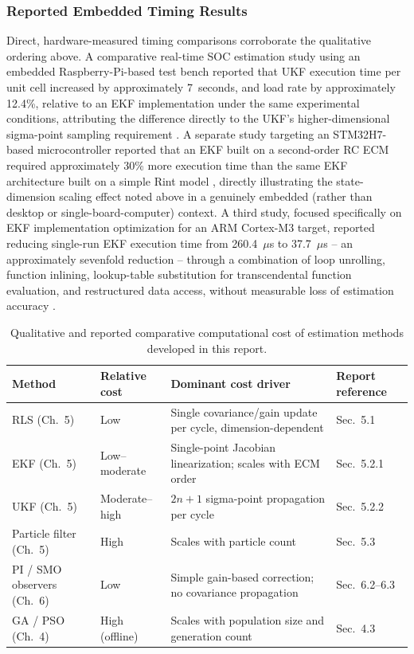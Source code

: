 \subsubsection{Reported Embedded Timing Results}
\label{ssec:reported_embedded_timing}

Direct, hardware-measured timing comparisons corroborate the qualitative ordering above. A comparative real-time SOC estimation study using an embedded Raspberry-Pi-based test bench reported that UKF execution time per unit cell increased by approximately 7~seconds, and load rate by approximately 12.4\%, relative to an EKF implementation under the same experimental conditions, attributing the difference directly to the UKF's higher-dimensional sigma-point sampling requirement \cite{realtime_soc_embedded_electronics_2022}. A separate study targeting an STM32H7-based microcontroller reported that an EKF built on a second-order RC ECM required approximately 30\% more execution time than the same EKF architecture built on a simple Rint model \cite{energy_efficient_soc_embedded_2024}, directly illustrating the state-dimension scaling effect noted above in a genuinely embedded (rather than desktop or single-board-computer) context. A third study, focused specifically on EKF implementation optimization for an ARM Cortex-M3 target, reported reducing single-run EKF execution time from 260.4~$\mu$s to 37.7~$\mu$s -- an approximately sevenfold reduction -- through a combination of loop unrolling, function inlining, lookup-table substitution for transcendental function evaluation, and restructured data access, without measurable loss of estimation accuracy \cite{ekf_embedded_optimization_researchgate}.

\begin{table}[htbp]
	\centering
	\caption{Qualitative and reported comparative computational cost of estimation methods developed in this report.}
	\label{tab:computational_cost}
	\begin{tabular}{p{2.6cm}p{2.0cm}p{5.0cm}p{2.6cm}}
		\toprule
		Method & Relative cost & Dominant cost driver & Report reference \\
		\midrule
		RLS (Ch.~5) & Low & Single covariance/gain update per cycle, dimension-dependent & Sec.~5.1 \\
		EKF (Ch.~5) & Low--moderate & Single-point Jacobian linearization; scales with ECM order & Sec.~5.2.1 \\
		UKF (Ch.~5) & Moderate--high & $2n+1$ sigma-point propagation per cycle & Sec.~5.2.2 \\
		Particle filter (Ch.~5) & High & Scales with particle count & Sec.~5.3 \\
		PI / SMO observers (Ch.~6) & Low & Simple gain-based correction; no covariance propagation & Sec.~6.2--6.3 \\
		GA / PSO (Ch.~4) & High (offline) & Scales with population size and generation count & Sec.~4.3 \\
		\bottomrule
	\end{tabular}
\end{table}

